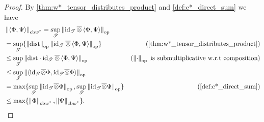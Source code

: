 \begin{proof}
  By \autoref{thm:w*_tensor_distributes_product}  and \autoref{def:c*_direct_sum} we have
  \begin{align*}
    &  \wcbnorm{\langle \Phi, \Psi \rangle}  = \sup_{\mathscr{T}} \opnorm{\id_{\mathscr{T}} \, \overline{\otimes} \, \langle \Phi, \Psi \rangle} \\
    & =  \sup_{\mathscr{T}}  \{ \opnorm{\dist} \opnorm{ \id_\mathscr{T} \, \overline{\otimes} \, \langle \Phi, \Psi \rangle} \} & (\text{\autoref{thm:w*_tensor_distributes_product}}) \\
    & \leq \sup_{\mathscr{T}} \opnorm{ \dist \cdot \id_\mathscr{T} \, \overline{\otimes} \, \langle \Phi, \Psi \rangle} & (\opnorm{\cdot }\text{ is submultiplicative w.r.t composition}) \\
    &  \leq \sup_{\mathscr{T}} \opnorm{ \langle \id_\mathscr{T}\overline{\otimes} \Phi,\id_\mathscr{T}\overline{\otimes} \Phi  \rangle} &  \\
    & = \max \{ \sup_{\mathscr{T}} \opnorm{ \id_\mathscr{T}\overline{\otimes} \Phi}, \sup_{\mathscr{T}} \opnorm{ \id_\mathscr{T}\overline{\otimes} \Psi} \} & (\text{\autoref{def:c*_direct_sum}}) \\
    & \leq  \max \{  \wcbnorm{ \Phi} , \wcbnorm{\Psi}\}.
  \end{align*} 


\end{proof}
